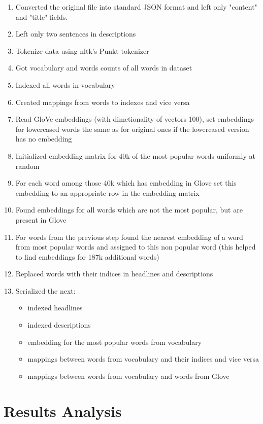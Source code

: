 \begin{enumerate}[noitemsep]
\item Converted the original file into standard JSON format and left only "content" and "title" fields.
\item Left only two sentences in descriptions
\item Tokenize data using nltk’s Punkt tokenizer
\item Got vocabulary and words counts of all words in dataset
\item Indexed all words in vocabulary 
\item Created mappings from words to indexes and vice versa
\item Read GloVe embeddings (with dimetionality of vectors 100), set embeddings for lowercased words the same as for original ones if the lowercased version has no embedding
\item Initialized embedding matrix for 40k of the most popular words uniformly at random
\item For each word among those 40k which has embedding in Glove set this embedding to an appropriate row in the embedding matrix 
\item Found embeddings for all words which are not the most popular, but are present in Glove
\item For words from the previous step found the nearest embedding of a word from most popular words and assigned to this non popular word (this helped to find embeddings for 187k additional words)
\item Replaced words with their indices in headlines and descriptions
\item Serialized the next:
	\begin{itemize}
		\item indexed headlines
		\item indexed descriptions
		\item embedding for the most popular words from vocabulary
 		\item mappings between words from vocabulary and their indices and vice versa
 		\item mappings between words from vocabulary and words from Glove
	\end{itemize}
 	
\end{enumerate}


\section{Results Analysis}

